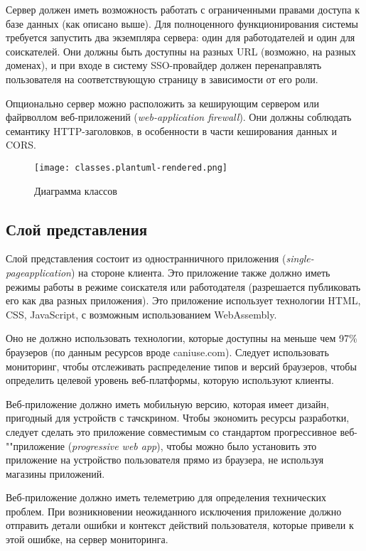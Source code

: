 \documentclass[a4page]{article}
\begin{document}
Сервер должен иметь возможность работать с ограниченными правами доступа к базе данных
(как описано выше).
Для полноценного функционирования системы требуется запустить два экземпляра сервера:
один для работодателей и один для соискателей.
Они должны быть доступны на разных URL
(возможно, на разных доменах),
и при входе в систему SSO-провайдер должен
перенаправлять пользователя на соответствующую страницу в зависимости от его роли.

Опционально сервер можно расположить за кеширующим сервером
или файрволлом веб-приложений (\textit{web-application firewall}).
Они должны соблюдать семантику HTTP-заголовков, в особенности в части кеширования данных и CORS.

\begin{figure}[H]
  \centering
  \texttt{[image: classes.plantuml-rendered.png]}
  \caption{Диаграмма классов}
\end{figure}

\subsection{Слой представления}

Слой представления состоит из одностранничного приложения
(\textit{single-page}\newline \textit{application}) на стороне клиента.
Это приложение также должно иметь режимы работы в режиме соискателя или работодателя
(разрешается публиковать его как два разных приложения).
Это приложение использует технологии HTML, CSS, JavaScript, с возможным использованием WebAssembly.

Оно не должно использовать технологии, которые доступны на меньше чем 97\% браузеров
(по данным ресурсов вроде caniuse.com).
Следует использовать мониторинг, чтобы отслеживать распределение типов и версий браузеров,
чтобы определить целевой уровень веб-платформы, которую используют клиенты.

Веб-приложение должно иметь мобильную версию, которая имеет дизайн,
пригодный для устройств с тачскрином. Чтобы экономить ресурсы разработки,
следует сделать это приложение совместимым со стандартом
прогрессивное веб-""приложение (\textit{progressive web app}),
чтобы можно было установить это приложение на устройство пользователя
прямо из браузера, не используя магазины приложений.

Веб-приложение должно иметь телеметрию для определения технических проблем.
При возникновении неожиданного исключения приложение
должно отправить детали ошибки и контекст действий пользователя,
которые привели к этой ошибке, на сервер мониторинга.
\end{document}
